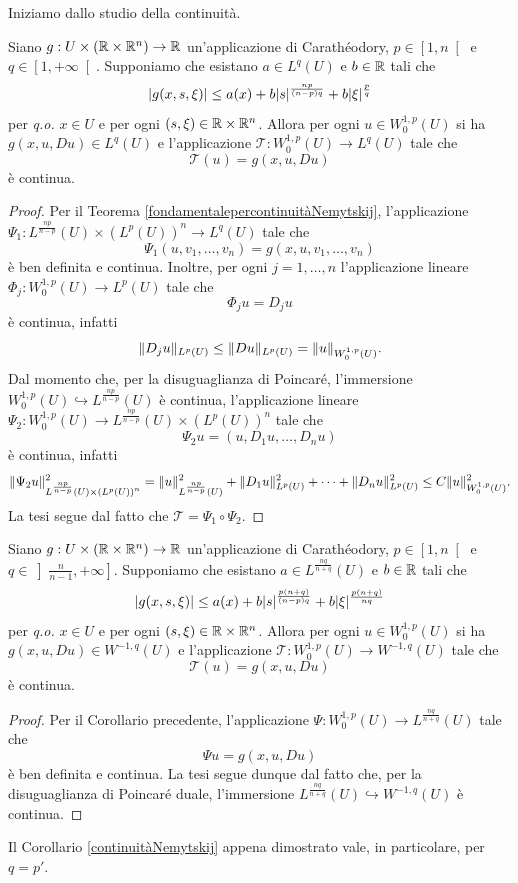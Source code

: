 Iniziamo dallo studio della continuità.
\begin{corollario}
	Siano $g : U \times (\mathbb{R} \times \mathbb{R}^n) \to \mathbb{R}$ un'applicazione di Carathéodory, $p \in \left[ 1,n\right[$ e $q \in \left[ 1,+\infty\right[ $. Supponiamo che esistano $a \in L^q(U)$ e $b \in \mathbb{R}$ tali
	che
	\[ \lvert g(x,s,\xi)\rvert \le a(x) + b\lvert s\rvert^{\frac{np}{(n-p)q}} + b\lvert\xi\rvert^{\frac{p}{q}} \]
	per \emph{q.o.} $x \in U$ e per ogni $(s,\xi) \in \mathbb{R} \times \mathbb{R}^n$. Allora per ogni $u \in W^{1,p}_0(U)$ si ha $g(x, u, Du) \in L^q(U)$ e l’applicazione $\mathcal{T}: W^{1,p}_0(U) \to L^q(U)$ tale che
	\[ \mathcal{T}(u) = g(x,u,Du) \]
	è continua.
\end{corollario}
\begin{proof}
	Per il Teorema \eqref{fondamentalepercontinuitàNemytskij}, l'applicazione $\Psi_1: L^{\frac{np}{n-p}}(U) \times \left( L^p(U)\right) ^n \to L^q(U)$ tale che
	\[ \Psi_1(u,v_1,\dots,v_n) = g(x,u,v_1,\dots,v_n) \]
	è ben definita e continua. Inoltre, per ogni $j =1,\dots,n$ l'applicazione lineare $\Phi_j : W^{1,p}_0(U) \to L^p(U)$ tale che
	\[ \Phi_ju = D_ju \]
	è continua, infatti 
	\[ \lVert D_ju\rVert_{L^p(U)} \le \lVert Du\rVert_{L^p(U)} = \lVert u\rVert_{W^{1,p}_0(U)}. \]
	Dal momento che, per la disuguaglianza di Poincaré, l'immersione $W^{1,p}_0(U) \hookrightarrow L^{\frac{np}{n-p}}(U)$ è continua, l'applicazione lineare $\Psi_2: W^{1,p}_0(U) \to L^{\frac{np}{n-p}}(U) \times \left( L^p(U)\right) ^n$ tale che
	\[ \Psi_2u = (u,D_1u,\dots,D_nu) \]
	è continua, infatti
	\[ \lVert\Psi_2u\rVert_{L^{\frac{np}{n-p}}(U) \times \left( L^p(U)\right) ^n}^2  = \lVert u\rVert_{L^{\frac{np}{n-p}}(U)}^2 + \lVert D_1u\rVert^2_{L^p(U)} + \dots + \lVert D_nu\rVert^2_{L^p(U)} \le C \lVert u\rVert_{W^{1,p}_0(U)}^2. \]
	La tesi segue dal fatto che $\mathcal{T} = \Psi_1 \circ \Psi_2$.
\end{proof}

\begin{corollario}\label{continuitàNemytskij}
	Siano $g : U \times (\mathbb{R} \times \mathbb{R}^n) \to \mathbb{R}$ un'applicazione di Carathéodory, $p \in \left[ 1,n\right[$ e $q \in \left] \frac{n}{n-1},+\infty\right] $. Supponiamo che esistano $a \in L^{\frac{nq}{n+q}}(U)$ e $b \in \mathbb{R}$ tali
	che
	\[ \lvert g(x,s,\xi)\rvert \le a(x) + b\lvert s\rvert^{\frac{p(n+q)}{(n-p)q}} + b\lvert\xi\rvert^{\frac{p(n+q)}{nq}} \]
	per \emph{q.o.} $x \in U$ e per ogni $(s,\xi) \in \mathbb{R} \times \mathbb{R}^n$. Allora per ogni $u \in W^{1,p}_0(U)$ si ha $g(x, u, Du) \in W^{-1,q}(U)$ e l’applicazione $\mathcal{T}: W^{1,p}_0(U) \to W^{-1,q}(U)$ tale che
	\[ \mathcal{T}(u) = g(x,u,Du) \]
	è continua.
\end{corollario}
\begin{proof}
	Per il Corollario precedente, l'applicazione $\Psi: W^{1,p}_0(U) \to L^{\frac{nq}{n+q}}(U)$ tale che
	\[ \Psi u = g(x,u,Du) \]
	è ben definita e continua. La tesi segue dunque dal fatto che, per la disuguaglianza di Poincaré duale, l'immersione $ L^{\frac{nq}{n+q}}(U) \hookrightarrow W^{-1,q}(U)$ è continua.
\end{proof}
\begin{osservazione}
	Il Corollario \eqref{continuitàNemytskij} appena dimostrato vale, in particolare, per $q = p'$.
\end{osservazione}

